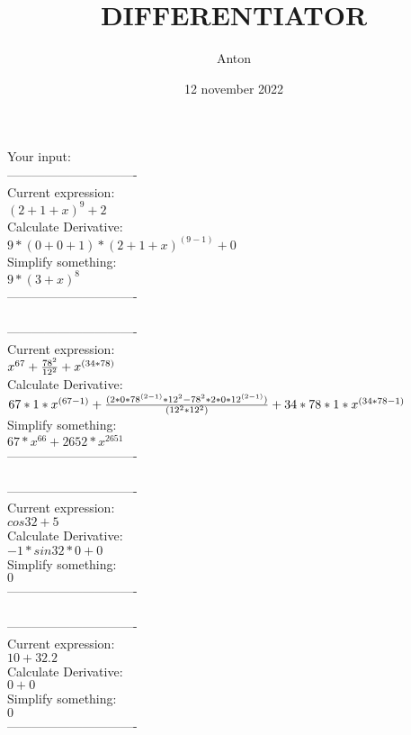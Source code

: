 \documentclass[12pt]{article}
\title{DIFFERENTIATOR}
\author{Anton}
\date{12 november 2022}
\begin{document}
    \maketitle
    Your input: \\
    
-------------------------------\\
Current expression:\\
\( {{(2+1+x)}^{9}}+2\) \\
Calculate Derivative:\\
\( 9*(0+0+1)*{{(2+1+x)}^{(9-1)}}+0\) \\
Simplify something:\\
\( 9*{{(3+x)}^{8}}\) \\
-------------------------------\\
\\
-------------------------------\\
Current expression:\\
\( {{x}^{67}}+{{{{78}^{2}}}\over{{{12}^{2}}}}+{{x}^{(34*78)}}\) \\
Calculate Derivative:\\
\( 67*1*{{x}^{(67-1)}}+{{(2*0*{{78}^{(2-1)}}*{{12}^{2}}-{{78}^{2}}*2*0*{{12}^{(2-1)}})}\over{({{12}^{2}}*{{12}^{2}})}}+34*78*1*{{x}^{(34*78-1)}}\) \\
Simplify something:\\
\( 67*{{x}^{66}}+2652*{{x}^{2651}}\) \\
-------------------------------\\
\\
-------------------------------\\
Current expression:\\
\( cos32+5\) \\
Calculate Derivative:\\
\( -1*sin32*0+0\) \\
Simplify something:\\
\( 0\) \\
-------------------------------\\
\\
-------------------------------\\
Current expression:\\
\( 10+32.2\) \\
Calculate Derivative:\\
\( 0+0\) \\
Simplify something:\\
\( 0\) \\
-------------------------------\\
\end{document}
